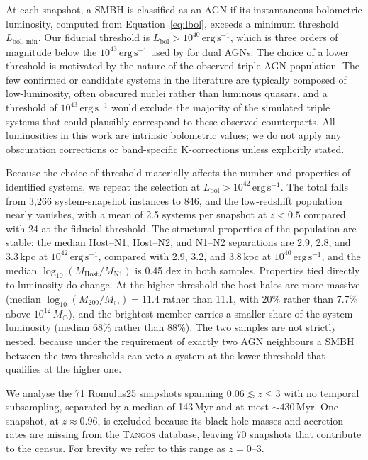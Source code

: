 \documentclass[twocolumn, 10pt]{article}
\begin{document}
At each snapshot, a SMBH is classified as an AGN if its instantaneous bolometric luminosity, computed from Equation~\ref{eq:lbol}, exceeds a minimum threshold $L_\mathrm{bol,\,min}$. Our fiducial threshold is $L_\mathrm{bol} > 10^{40}\,\mathrm{erg\,s^{-1}}$, which is three orders of magnitude below the $10^{43}\,\mathrm{erg\,s^{-1}}$ used by \citet{Saeedzadeh2024} for dual AGNs. The choice of a lower threshold is motivated by the nature of the observed triple AGN population. The few confirmed or candidate systems in the literature are typically composed of low-luminosity, often obscured nuclei rather than luminous quasars, and a threshold of $10^{43}\,\mathrm{erg\,s^{-1}}$ would exclude the majority of the simulated triple systems that could plausibly correspond to these observed counterparts. All luminosities in this work are intrinsic bolometric values; we do not apply any obscuration corrections or band-specific K-corrections unless explicitly stated.

Because the choice of threshold materially affects the number and properties of identified systems, we repeat the selection at $L_\mathrm{bol} > 10^{42}\,\mathrm{erg\,s^{-1}}$. The total falls from 3,266 system-snapshot instances to 846, and the low-redshift population nearly vanishes, with a mean of 2.5 systems per snapshot at $z < 0.5$ compared with 24 at the fiducial threshold. The structural properties of the population are stable: the median Host--N1, Host--N2, and N1--N2 separations are 2.9, 2.8, and 3.3\,kpc at $10^{42}\,\mathrm{erg\,s^{-1}}$, compared with 2.9, 3.2, and 3.8\,kpc at $10^{40}\,\mathrm{erg\,s^{-1}}$, and the median $\log_{10}(M_\mathrm{Host}/M_\mathrm{N1})$ is 0.45 dex in both samples. Properties tied directly to luminosity do change. At the higher threshold the host halos are more massive (median $\log_{10}(M_{200}/M_\odot) = 11.4$ rather than 11.1, with 20\% rather than 7.7\% above $10^{12}\,M_\odot$), and the brightest member carries a smaller share of the system luminosity (median 68\% rather than 88\%). The two samples are not strictly nested, because under the requirement of exactly two AGN neighbours a SMBH between the two thresholds can veto a system at the lower threshold that qualifies at the higher one.

We analyse the 71 Romulus25 snapshots spanning $0.06 \lesssim z \leq 3$ with no temporal subsampling, separated by a median of 143\,Myr and at most $\sim 430$\,Myr. One snapshot, at $z \approx 0.96$, is excluded because its black hole masses and accretion rates are missing from the \textsc{Tangos} database, leaving 70 snapshots that contribute to the census. For brevity we refer to this range as $z = 0$--$3$.
\end{document}
